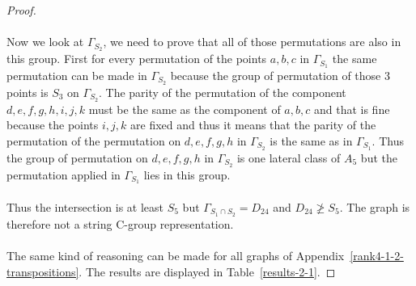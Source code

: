 \begin{proof}
  \paragraph{}
  Now we look at $\Gamma_{S_2}$, we need to prove that all of those permutations are also in this group. First for every permutation of the points $a,b,c$ in $\Gamma_{S_1}$ the same permutation can be made in $\Gamma_{S_2}$ because the group of permutation of those 3 points is $S_3$ on $\Gamma_{S_2}$. The parity of the permutation of the component $d,e,f,g,h,i,j,k$ must be the same as the component of $a,b,c$ and that is fine because the points $i,j,k$ are fixed and thus it means that the parity of the permutation of the permutation on $d,e,f,g,h$ in $\Gamma_{S_2}$ is the same as in $\Gamma_{S_1}$. Thus the group of permutation on $d,e,f,g,h$ in $\Gamma_{S_2}$ is one lateral class of $A_5$ but the permutation applied in $\Gamma_{S_1}$ lies in this group.

  \paragraph{}
  Thus the intersection is at least $S_5$ but $\Gamma_{S_1 \cap S_2} = D_{24}$ and $D_{24} \not \ge S_5$. The graph is therefore not a string C-group representation.

  \paragraph{}
  The same kind of reasoning can be made for all graphs of Appendix~\ref{rank4-1-2-transpositions}. The results are displayed in Table~\ref{results-2-1}.


\end{proof}
